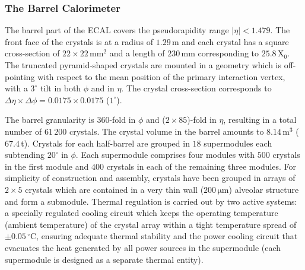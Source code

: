 \subsubsection{The Barrel Calorimeter}
The barrel part of the ECAL covers the pseudorapidity range $|\eta| < 1.479$.
The front face of the crystals is at a radius of $1.29 \,$m and each crystal has a square cross-section of $ 22 \times 22 \,$mm$^2$ and a length of $230 \,$mm corresponding to $25.8 \,$X$_0$. The truncated pyramid-shaped crystals are mounted in a geometry which is off-pointing with respect to the mean position of the primary interaction vertex, with a $3^{\circ}$ tilt in both $\phi$ and in $\eta$. The crystal cross-section corresponds to $\Delta \eta \times \Delta \phi = 0.0175 \times 0.0175$ ($1^{\circ}$). 

The barrel granularity is $360$-fold in $\phi$ and ($2 \times 85$)-fold in $\eta$, resulting in a total number of $61\,200$ crystals. The crystal volume in the barrel amounts to $8.14 \,$m$^3$ ($67.4 \,$t). Crystals for each half-barrel are grouped in $18$ supermodules each subtending $20^{\circ}$ in $\phi$. Each supermodule comprises four modules with $500$ crystals in the first module and $400$ crystals in each of the remaining three modules. For simplicity of construction and assembly, crystals have been grouped in arrays of $2 \times 5$ crystals which are contained in a very thin wall ($200 \,\mathrm{\mu m}$) alveolar structure and form a submodule.  Thermal regulation is carried out by two active systems: a specially regulated cooling circuit which keeps the operating temperature (ambient temperature) of the crystal array within a tight temperature spread of $\pm0.05 \, ^{\circ}$C, ensuring adequate thermal stability and the power cooling circuit that evacuates the heat generated by all power sources in the supermodule (each supermodule is designed as a separate thermal entity).


